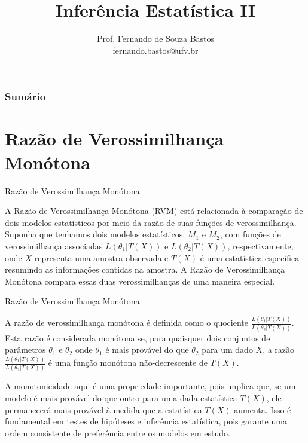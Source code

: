 \documentclass[12pt]{beamer}
\title{Inferência Estatística II}
\author{Prof. Fernando de Souza Bastos\texorpdfstring{\\ fernando.bastos@ufv.br}{}}
\institute{Departamento de Estatística\texorpdfstring{\\ Programa de Pós-Graduação em Estatística Aplicada e Biometria}\texorpdfstring{\\ Universidade Federal de Viçosa}{}\texorpdfstring{\\ Campus UFV - Viçosa}{}}
\date{}
\begin{document}

\frame{\titlepage}

\begin{frame}{}
\frametitle{\bf Sumário}
\tableofcontents
\end{frame}

\section{Razão de Verossimilhança Monótona}
\begin{frame}{Razão de Verossimilhança Monótona}
\begin{block}{}
\justifying
A Razão de Verossimilhança Monótona (RVM) está relacionada à comparação de dois modelos estatísticos por meio da razão de suas funções de verossimilhança. Suponha que tenhamos dois modelos estatísticos, \(M_1\) e \(M_2\), com funções de verossimilhança associadas \(L(\theta_1 | T(X))\) e \(L(\theta_2 | T(X))\), respectivamente, onde \(X\) representa uma amostra observada e \(T(X)\) é uma estatística específica resumindo as informações contidas na amostra. A Razão de Verossimilhança Monótona compara essas duas verossimilhanças de uma maneira especial.
\end{block}
\end{frame}

\begin{frame}{Razão de Verossimilhança Monótona}
\begin{block}{}
\justifying
A razão de verossimilhança monótona é definida como o quociente \(\frac{L(\theta_1 | T(X))}{L(\theta_2 | T(X))}\). Esta razão é considerada monótona se, para quaisquer dois conjuntos de parâmetros \(\theta_1\) e \(\theta_2\) onde \(\theta_1\) é mais provável do que \(\theta_2\) para um dado \(X\), a razão \(\frac{L(\theta_1 | T(X))}{L(\theta_2 | T(X))}\) é uma função monótona não-decrescente de \(T(X)\).
\end{block}
\pause
\begin{block}{}
\justifying
A monotonicidade aqui é uma propriedade importante, pois implica que, se um modelo é mais provável do que outro para uma dada estatística \(T(X)\), ele permanecerá mais provável à medida que a estatística \(T(X)\) aumenta. Isso é fundamental em testes de hipóteses e inferência estatística, pois garante uma ordem consistente de preferência entre os modelos em estudo.
\end{block}
\end{frame}
\end{document}
